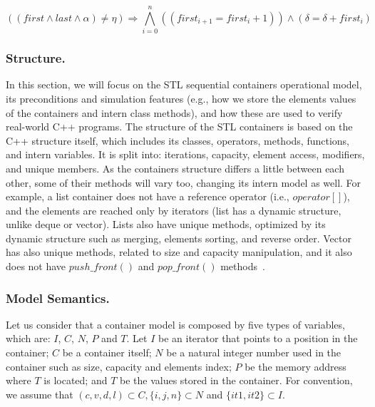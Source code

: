 \documentclass[a4paper]{llncs}
\begin{document}
\begin{equation}
\left(\left(first \wedge last \wedge \alpha\right) \neq \eta\right) \Rightarrow
\bigwedge^{n}_{i=0} \left(\left(first_{i+1} = first_{i} +1\right)\right) \wedge \left(\delta = \delta + first_{i}\right)
\label{eq:accumulate}
\end{equation}

\subsubsection{Structure.}

In this section, we will focus on the STL sequential 
containers operational model, its preconditions and 
simulation features (e.g., how we store the elements 
values of the containers and intern class methods), 
and how these are used to verify real-world C++ programs.
The structure of the STL containers is based on the 
C++ structure itself, which includes its classes, operators, 
methods, functions, and intern variables. It is split into: 
iterations, capacity, element access, modifiers, and unique 
members. As the containers structure differs a little 
between each other, some of their methods will vary too, 
changing its intern model as well. For example, a list container 
does not have a reference operator (i.e., $operator\left[\right]$), and the elements 
are reached only by iterators (list has a dynamic structure, 
unlike deque or vector). Lists also have unique methods, optimized by its 
dynamic structure such as merging, elements sorting, and reverse order.
Vector has also unique methods, related to size and capacity manipulation, 
and it also does not have $push\_front\left(\right)$ 
and $pop\_front\left(\right)$ methods~\cite{CppReference12}.

\subsubsection{Model Semantics.}
	
Let us consider that a container model is composed 
by five types of variables, which are: $I$, $C$, 
$N$, $P$ and $T$. Let $I$ be an iterator that points 
to a position in the container; $C$ be a container itself; 
$N$ be a natural integer number used in the container
such as size, capacity and elements index; $P$ be 
the memory address where $T$ is located; and $T$ be the 
values stored in the container. 
For convention, we assume that 
$\left(c, v, d, l\right) \subset C, \{i, j, n\} 
\subset N$ and $\{it1, it2\} \subset I$. 
	
\end{document}
